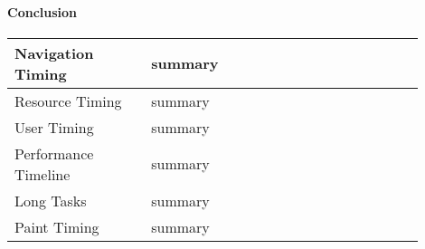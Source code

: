 \paragraph{Conclusion}








\begin{center}
\small
	\begin{tabular}{ p{0.3\linewidth} | p{0.6\linewidth} }
	\hline
	Navigation Timing & summary  \\ 
	\hline
	Resource Timing & summary  \\  
	\hline
	User Timing & summary  \\  
	\hline
	Performance Timeline & summary  \\  
	\hline
	Long Tasks & summary  \\  
	\hline
	Paint Timing & summary  \\  
	\hline
	\end{tabular}
\end{center}






